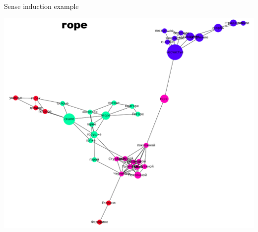 \begin{frame}{ Sense induction  example}


 \begin{center}
  	\includegraphics[height=0.68\textheight]{figures/gore}
  \end{center}
  


\end{frame}



